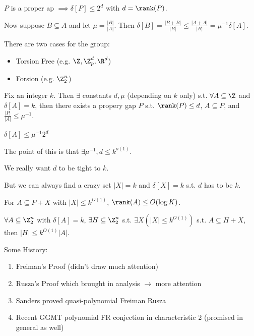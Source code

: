 \documentclass[a4paper]{article}
\begin{document}
$P $ is a proper ap $\implies \delta[P] \le 2^d $ with $d = \rank(P) $.

Now suppose $B\subseteq A $ and let $\mu = \frac{|B|}{|A|} $.
Then $\delta[B] = \frac{|B+B|}{|B|} \le \frac{|A+A|}{|B|} = \mu ^{-1}\delta[A] $.

There are two cases for the group:
\begin{itemize}
	\item Torsion Free (e.g. $\Z,\Z_p^d,\R^d $)
	\item Forsion (e.g. $\Z_2^n $)
\end{itemize}

\begin{thm}
	Fix an integer $k $.
	Then $\exists $ constants $d,\mu $ (depending on $k $ only) s.t. $\forall A\subseteq \Z $ and $\delta[A] = k $, then there exists a propery gap $P $ s.t. $\rank(P)\le d $, $A \subseteq P $, and $\frac{|P|}{|A|}\le \mu ^{-1} $.
\end{thm}

\begin{cor}
	$\delta[A] \le \mu ^{-1}2^d $
\end{cor}

The point of this is that $\exists \mu ^{-1}, d \le k^{o(1)}  $.

We really want $d $ to be tight to $k $.

But we can always find a crazy set $|X| = k $ and $\delta[X] = k $ s.t. $d$ has to be $k $.

\begin{conj}
	For $A\subseteq P + X $ with $|X| \le k^{O(1)}$, $\rank(A) \le O(\log K) $.
\end{conj}

\begin{thm}
	$\forall A \subseteq \Z_2^n $ with $\delta[A] =k $, $\exists H \subseteq \Z_2^n $ s.t. $\exists X(|X| \le k^{O(1)})  $ s.t. $A\subseteq H + X $, then $|H| \le k^{O(1)}|A|  $.
\end{thm}

Some History:

\begin{enumerate}
	\item Freiman's Proof (didn't draw much attention)
	\item Rusza's Proof which brought in analysis $\rightarrow $ more attention
	\item Sanders proved quasi-polynomial Freiman Rusza
	\item Recent GGMT polynomial FR conjection in characteristic 2 (promised in general as well)
\end{enumerate}
\end{document}
